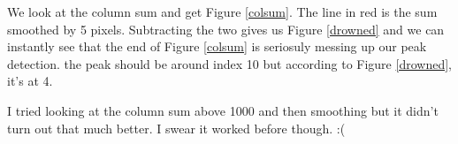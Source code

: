 \documentclass[10pt]{scrartcl}
\begin{document}
We look at the column sum and get Figure \ref{colsum}. The line in red is the sum smoothed by 5 pixels. Subtracting the two gives us Figure \ref{drowned} and we can instantly see that the end of Figure \ref{colsum} is seriosuly messing up our peak detection. the peak should be around index 10 but according to Figure \ref{drowned}, it's at 4.

\begin{figure}[!ht]
{
\caption{}
\label{badfid}
}
\end{figure}

I tried looking at the column sum above 1000 and then smoothing but it didn't turn out that much better. I swear it worked before though. :(

\begin{figure}[!ht]
{
\caption{}
\label{stillbadfid}
}
\end{figure}

\end{document}
